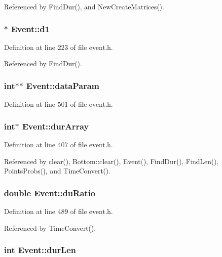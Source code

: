 Referenced by Find\-Dur(), and New\-Create\-Matrices().
\subsubsection{ $\ast$ {\bf Event::d1}}\label{classEvent_o4}




Definition at line 223 of file event.h.

Referenced by Find\-Dur().
\subsubsection{\setlength{\rightskip}{0pt plus 5cm}int$\ast$$\ast$ {\bf Event::data\-Param}}\label{classEvent_o51}




Definition at line 501 of file event.h.
\subsubsection{\setlength{\rightskip}{0pt plus 5cm}int$\ast$ {\bf Event::dur\-Array}}\label{classEvent_o29}




Definition at line 407 of file event.h.

Referenced by clear(), Bottom::clear(), Event(), Find\-Dur(), Find\-Len(), Points\-Probs(), and Time\-Convert().
\subsubsection{\setlength{\rightskip}{0pt plus 5cm}double {\bf Event::du\-Ratio}}\label{classEvent_o41}




Definition at line 489 of file event.h.

Referenced by Time\-Convert().
\subsubsection{\setlength{\rightskip}{0pt plus 5cm}int {\bf Event::dur\-Len}}\label{classEvent_o27}





